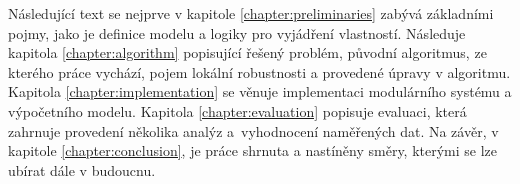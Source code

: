 Následující text se nejprve v kapitole \ref{chapter:preliminaries} zabývá základními pojmy, jako je definice modelu a logiky
pro vyjádření vlastností. Následuje kapitola \ref{chapter:algorithm} popisující řešený problém, původní
algoritmus, ze kterého práce vychází, pojem lokální robustnosti a provedené úpravy v algoritmu.
Kapitola \ref{chapter:implementation} se věnuje implementaci modulárního systému a výpočetního modelu.
Kapitola \ref{chapter:evaluation} popisuje evaluaci, která zahrnuje provedení několika analýz
a~vy\-hod\-no\-ce\-ní naměřených dat. Na závěr, v kapitole \ref{chapter:conclusion}, je práce
shrnuta a nastíněny směry, kterými se lze ubírat dále v budoucnu.

